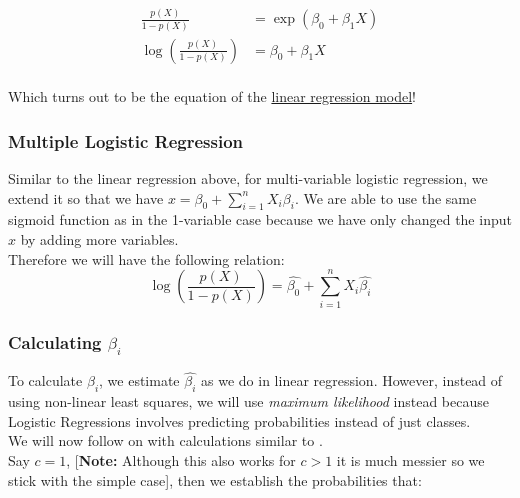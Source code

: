 \documentclass[11pt,a4paper]{report}
\begin{document}
\begin{equation}
\begin{split}
    \frac{p(X)}{1 - p(X)} &= \exp(\beta_0 + \beta_1X) \\
   \log\left(\frac{p(X)}{1 - p(X)}\right) &= \beta_0 + \beta_1X   
\end{split}
\end{equation}\\
Which turns out to be the equation of the \underline{linear regression model}! \cite[Section 4.4]{ESL}

\subsubsection{Multiple Logistic Regression}
Similar to the linear regression above, for multi-variable logistic regression, we extend it so that we have $x=\beta_0 + \sum_{i=1}^{n} X_i\beta_i$. We are able to use the same sigmoid function as in the 1-variable case because we have only changed the input $x$ by adding more variables.\\
Therefore we will have the following relation:
\[\log\left(\frac{p(X)}{1 - p(X)}\right) = \hat{\beta_0} + \sum_{i=1}^{n} X_i\hat{\beta_i}\]


\subsubsection{Calculating \textbf{$\beta_i$}}
To calculate $\beta_i$, we estimate $\hat{\beta_i}$ as we do in linear regression. However, instead of using non-linear least squares, we will use \textit{maximum likelihood} instead because Logistic Regressions involves predicting probabilities instead of just classes.\\
\bigskip
We will now follow on with calculations similar to \cite{CMULR}.\\
Say $c = 1$, [\textbf{Note:} Although this also works for $c > 1$ it is much messier so we stick with the simple case], then we establish the probabilities that:
\end{document}
